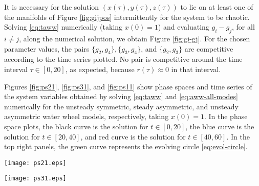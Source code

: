 It is necessary for the solution $(x(\tau),y(\tau),z(\tau))$ to lie 
on at least one of the manifolds of Figure \ref{fig:gijpos} intermittently for the system 
to be chaotic. Solving \eqref{eq:taww} numerically (taking $x(0)=1$) and evaluating $g_i -g_j$, for all $i \neq 
j$, along the numerical solution, we obtain Figure \ref{fig:gi-gj}. For the chosen 
parameter values, the pairs $\{g_2,g_4\}, \{g_3,g_4\}$, and $\{g_2,g_3\}$ are 
competitive according to the time series plotted. No pair is competitive around the time 
interval $\tau \in [0,20]$, as expected, because $r(\tau) \approx 0$ in that 
interval.

Figures \ref{fig:ps21}, \ref{fig:ps31}, and \ref{fig:ps11} show phase spaces and time series of the system variables obtained by solving \eqref{eq:taww} and \eqref{eq:aww-all-modes} numerically for the unsteady symmetric, steady asymmetric, and unsteady asymmetric water wheel models, respectively, taking $x(0)=1$. In the phase space plots, the black curve is the solution for $t\in [0,20]$, the blue curve is the solution for $t\in [20,40]$, and red curve is the solution for $t\in [40,60]$. In the top right panels, the green curve represents the evolving circle \eqref{eq:evol-circle}.


\begin{figure*}
\centering
\texttt{[image: ps21.eps]}
\caption{Phase space and time series of solutions to \eqref{eq:aww-all-modes} for the unsteady symmetric water wheel when $x(0)=1$. In the top left panel we plot the phase portraits for $(x,y,z)\in\mathbb{R}^3$. In the top right panel we plot the phase space for the $n=2$ modes $a_2$ and $b_2$ as well as the evolving circle from \eqref{eq:evol-circle} (shown in green). We plot time series of $x(t)$, $y(t)$, and $z(t)$ in the lower left panel and of $a_2(t)$ and $b_2(t)$ in the lower right panel. }
 \label{fig:ps21}
\end{figure*}

\begin{figure*}
\centering
\texttt{[image: ps31.eps]}
\caption{Phase space and time series of solutions to \eqref{eq:aww-all-modes} for the steady asymmetric water wheel when $x(0)=1$. In the top left panel we plot the phase portraits for $(x,y,z)\in\mathbb{R}^3$. In the top right panel we plot the phase space for the $n=2$ modes $a_2$ and $b_2$ as well as the evolving circle from \eqref{eq:evol-circle} (shown in green). We plot time series of $x(t)$, $y(t)$, and $z(t)$ in the lower left panel and of $a_2(t)$ and $b_2(t)$ in the lower right panel. }
 \label{fig:ps31}
\end{figure*}

